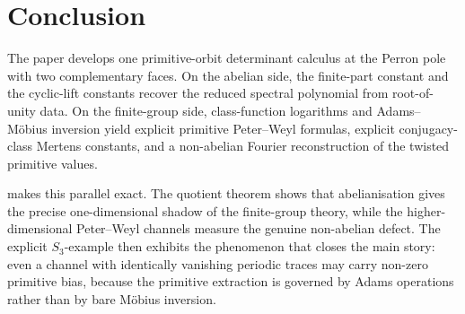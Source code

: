 \section{Conclusion}\label{sec:conclusion}

The paper develops one primitive-orbit determinant calculus at the
Perron pole with two complementary faces. On the abelian side, the
finite-part constant and the cyclic-lift constants recover the reduced
spectral polynomial from root-of-unity data. On the finite-group side,
class-function logarithms and Adams--M\"obius inversion yield explicit
primitive Peter--Weyl formulas, explicit conjugacy-class Mertens
constants, and a non-abelian Fourier reconstruction of the twisted
primitive values.

 makes this parallel exact. The quotient theorem
shows that abelianisation gives the precise one-dimensional shadow of
the finite-group theory, while the higher-dimensional Peter--Weyl
channels measure the genuine non-abelian defect. The explicit
\(S_3\)-example then exhibits the phenomenon that closes the main
story: even a channel with identically vanishing periodic traces may
carry non-zero primitive bias, because the primitive extraction is
governed by Adams operations rather than by bare M\"obius inversion.
